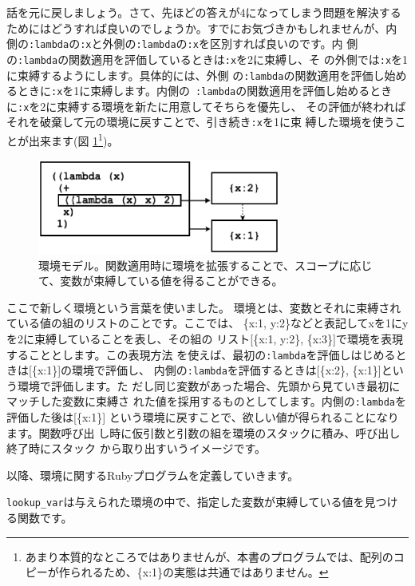 話を元に戻しましょう。さて、先ほどの答えが4になってしまう問題を解決する
ためにはどうすれば良いのでしょうか。すでにお気づきかもしれませんが、内
側の{\tt :lambda}の{\tt :x}と外側の{\tt :lambda}の{\tt :x}を区別すれば良いのです。内
側の{\tt :lambda}の関数適用を評価しているときは{\tt :x}を2に束縛し、そ
の外側では{\tt :x}を1に束縛するようにします。具体的には、外側
の{\tt :lambda}の関数適用を評価し始めるときに{\tt :x}を1に束縛します。内側の{\tt
:lambda}の関数適用を評価し始めるときに{\tt :x}を2に束縛する環境を新たに用意してそちらを優先し、
その評価が終わればそれを破棄して元の環境に戻すことで、引き続き{\tt :x}を1に束
縛した環境を使うことが出来ます(図 \ref{fig:environment2}\footnote{あまり本質的なところではありませんが、本書のプログラムでは、配列のコピーが作られるため、\{x:1\}の実態は共通ではありません。})。

\begin{figure}[htbp]
\begin{center}
\includegraphics[width=80mm]{images/environment2.eps}
\end{center}
\caption{環境モデル。関数適用時に環境を拡張することで、スコープに応じて、変数が束縛している値を得ることができる。}
\label{fig:environment2}
\end{figure}

ここで新しく環境という言葉を使いました。
環境とは、変数とそれに束縛されている値の組のリストのことです。ここでは、
\{x:1, y:2\}などと表記してxを1にyを2に束縛していることを表し、その組の
リスト[\{x:1, y:2\}, \{x:3\}]で環境を表現することとします。この表現方法
を使えば、最初の{\tt :lambda}を評価しはじめるときは[\{x:1\}]の環境で評価し、
内側の{\tt :lambda}を評価するときは[\{x:2\}, \{x:1\}]という環境で評価します。た
だし同じ変数があった場合、先頭から見ていき最初にマッチした変数に束縛さ
れた値を採用するものとしてします。内側の{\tt :lambda}を評価した後は[\{x:1\}]
という環境に戻すことで、欲しい値が得られることになります。関数呼び出
し時に仮引数と引数の組を環境のスタックに積み、呼び出し終了時にスタック
から取り出すいうイメージです。

以降、環境に関するRubyプログラムを定義していきます。

{\tt lookup\_var}は与えられた環境の中で、指定した変数が束縛している値を見つける関数です。

